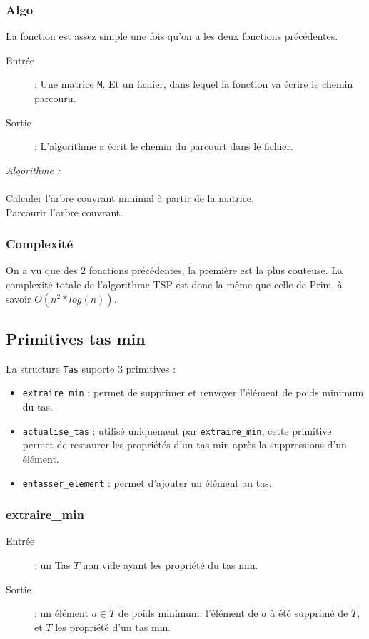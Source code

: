 \documentclass[a4paper,11pt]{article}
\begin{document}
\subsubsection*{Algo}
La fonction est assez simple une fois qu'on a les deux fonctions précédentes.
\begin{description}
\item[Entrée] : Une matrice \texttt{M}. Et un fichier, dans lequel la fonction va écrire le chemin parcouru.
\item[Sortie] : L'algorithme a écrit le chemin du parcourt dans le fichier.\\
\end{description}

\textit{Algorithme : }\\
\\
Calculer l'arbre couvrant minimal à partir de la matrice.\\
Parcourir l'arbre couvrant.\\

\subsubsection*{Complexité}
On a vu que des 2 fonctions précédentes, la première est la plus couteuse.
La complexité totale de l'algorithme TSP est donc la même que celle de Prim, à savoir $O(n^2*log(n))$.

\subsection{Primitives tas min} %
La structure \texttt{Tas} suporte 3 primitives :
\begin{itemize}
\item \texttt{extraire\_min} : permet de supprimer et renvoyer l’élément de poids minimum du tas.
\item \texttt{actualise\_tas} : utilisé uniquement par \texttt{extraire\_min}, cette primitive permet de restaurer les propriétés d'un tas min après la suppressions d'un élément.
\item \texttt{entasser\_element} : permet d'ajouter un élément au tas.
\end{itemize}
\subsubsection*{extraire\_min}
\begin{description}
\item[Entrée] : un \textsf{Tas} $T$ non vide ayant les propriété du tas min.
\item[Sortie] : un élément $a \in T$ de poids minimum. l'élément de $a$ à été supprimé de $T$, et $T$ les propriété d'un tas min.
\end{description}
\end{document}
